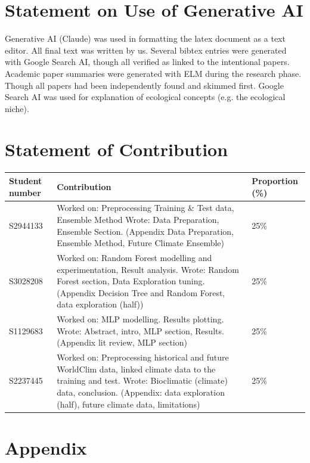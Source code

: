 \documentclass{article}
\begin{document}



\section*{Statement on Use of Generative AI}

 Generative AI (Claude) was used in formatting the latex document as a text editor. All final text was written by us.
 Several bibtex entries were generated with Google Search AI, though all verified as linked to the intentional papers.
 Academic paper summaries were generated with ELM during the research phase. Though all papers had been independently found and skimmed first. 
 Google Search AI was used for explanation of ecological concepts (e.g. the ecological niche).


\section*{Statement of Contribution}

\begin{center}
  \begin{tabular}{@{}lp{}l@{}}
    \toprule
    Student number & Contribution & Proportion (\%) \\
    \midrule
    S2944133 & Worked on: Preprocessing Training \& Test data, Ensemble Method Wrote: Data Preparation, Ensemble Section. (Appendix Data Preparation, Ensemble Method, Future Climate Ensemble) & 25\% \\
    S3028208 & Worked on: Random Forest modelling and experimentation, Result analysis. Wrote: Random Forest section, Data Exploration tuning. (Appendix Decision Tree and Random Forest, data exploration (half)) & 25\% \\
    S1129683 & Worked on: MLP modelling. Results plotting. Wrote: Abstract, intro, MLP section, Results.(Appendix lit review, MLP section) & 25\% \\
    S2237445 & Worked on: Preprocessing historical and future WorldClim data, linked climate data to the training and test. Wrote: Bioclimatic (climate) data, conclusion. (Appendix: data exploration (half), future climate data, limitations) & 25\% \\
    \bottomrule
  \end{tabular}
\end{center}

\appendix

\section*{Appendix}
\renewcommand{\thesubsection}{\Alph{subsection}}
\end{document}
